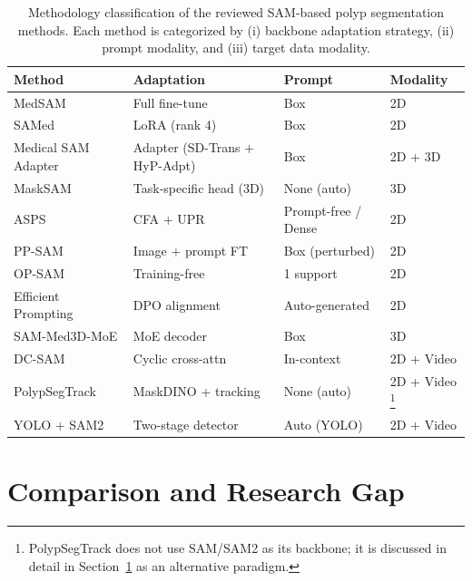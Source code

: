 \begin{table}[H]
\centering
\caption{Methodology classification of the reviewed SAM-based polyp segmentation methods. Each method is categorized by (i) backbone adaptation strategy, (ii) prompt modality, and (iii) target data modality.}
\label{tab:methodology}
\begin{tabular}{llll}
\toprule
\textbf{Method} & \textbf{Adaptation} & \textbf{Prompt} & \textbf{Modality} \\
\midrule
MedSAM \cite{ma2024medsam}          & Full fine-tune      & Box             & 2D  \\
SAMed \cite{zhang2023samed}         & LoRA (rank 4)       & Box             & 2D  \\
Medical SAM Adapter \cite{wu2023medical} & Adapter (SD-Trans + HyP-Adpt) & Box & 2D + 3D \\
MaskSAM \cite{cheng2024masksam}     & Task-specific head (3D)  & None (auto)     & 3D  \\
ASPS \cite{li2024asps}              & CFA + UPR            & Prompt-free / Dense & 2D  \\
PP-SAM \cite{rahman2024ppsam}       & Image + prompt FT   & Box (perturbed) & 2D  \\
OP-SAM \cite{li2025opsam}           & Training-free       & 1 support       & 2D  \\
Efficient Prompting \cite{konwer2025efficient} & DPO alignment       & Auto-generated  & 2D  \\
SAM-Med3D-MoE \cite{wang2024sammed3dmoe} & MoE decoder         & Box             & 3D  \\
DC-SAM \cite{qi2025dcsam}           & Cyclic cross-attn   & In-context      & 2D + Video \\
PolypSegTrack \cite{choudhuri2025polypsegtrack}    & MaskDINO + tracking & None (auto)     & 2D + Video \footnote{PolypSegTrack does not use SAM/SAM2 as its backbone; it is discussed in detail in Section~\ref{sec:comparison} as an alternative paradigm.} \\
YOLO + SAM2 \cite{mansoori2024selfprompt} & Two-stage detector & Auto (YOLO)     & 2D + Video \\
\bottomrule
\end{tabular}
\end{table}



\section{Comparison and Research Gap}
\label{sec:comparison}

